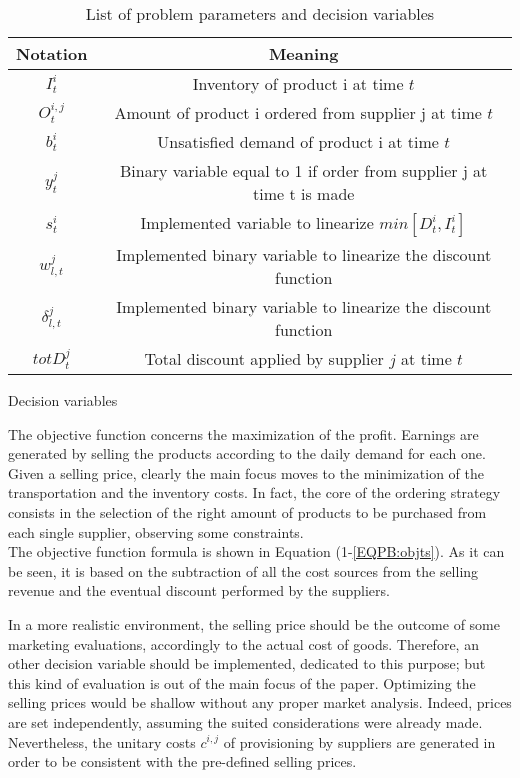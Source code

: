 \documentclass{article}
\begin{document}
\begin{table} [H]
    \begin{subtable}[c]{\textwidth}
        \centering
	    \begin{tabular}{|c|c|} 
		\hline
		\textbf{Notation} & \textbf{Meaning} \\
		\hline
		$I^i_t$ & Inventory of product i at time $t$ \\
		$O^{i,j}_t$ & Amount of product i ordered from supplier j at time $t$\\ \hline
		$b^i_t$ & Unsatisfied demand of product i at time $t$ \\
		$y^j_t$ & Binary variable equal to 1 if order from supplier j at time t is made\\
		$s^i_t$ & Implemented variable to linearize $min[D^i_t, I^i_t]$\\
		$w^j_{l,t}$ & Implemented binary variable to linearize the discount function \\
		$\delta^j_{l,t}$ & Implemented binary variable to linearize the discount function \\
		$totD^j_t$ & Total discount applied by supplier $j$ at time $t$\\
	    \hline
	    \end{tabular}
        \caption{Decision variables} 
        \vspace{5mm}
        \end{subtable}  
        \caption{List of problem parameters and decision variables}
        \label{tab:parameters}
\end{table}
The objective function concerns the maximization of the profit. Earnings are generated by selling the products according to the daily demand for each one. Given a selling price, clearly the main focus moves to the minimization of the transportation and the inventory costs. In fact, the core of the ordering strategy consists in the selection of the right amount of products to be purchased from each single supplier, observing some constraints.\\ The objective function formula is shown in Equation (1-\ref{EQPB:objts}). As it can be seen, it is based on the subtraction of all the cost sources from the selling revenue and the eventual discount performed by the suppliers. \par
In a more realistic environment, the selling price should be the outcome of some marketing evaluations, accordingly to the actual cost of goods. Therefore, an other decision variable should be implemented, dedicated to this purpose; but this kind of evaluation is out of the main focus of the paper. Optimizing the selling prices would be shallow without any proper market analysis. Indeed, prices are set independently, assuming the suited considerations were already made. Nevertheless, the unitary costs $c^{i,j}$ of provisioning by suppliers are generated in order to be consistent with the pre-defined selling prices. \par
\end{document}
